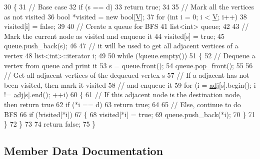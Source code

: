 \begin{DoxyCode}
30 \{
31     \textcolor{comment}{// Base case}
32     \textcolor{keywordflow}{if} (s == d)
33         \textcolor{keywordflow}{return} \textcolor{keyword}{true};
34  
35     \textcolor{comment}{// Mark all the vertices as not visited}
36     \textcolor{keywordtype}{bool} *visited = \textcolor{keyword}{new} \textcolor{keywordtype}{bool}[\hyperlink{classGraph_a2b722f7cfa7a21e4cb5fae488b3d4dcc}{V}];
37     \textcolor{keywordflow}{for} (\textcolor{keywordtype}{int} i = 0; i < \hyperlink{classGraph_a2b722f7cfa7a21e4cb5fae488b3d4dcc}{V}; i++)
38         visited[i] = \textcolor{keyword}{false};
39  
40     \textcolor{comment}{// Create a queue for BFS}
41     list<int> queue;
42  
43     \textcolor{comment}{// Mark the current node as visited and enqueue it}
44     visited[s] = \textcolor{keyword}{true};
45     queue.push\_back(s);
46  
47     \textcolor{comment}{// it will be used to get all adjacent vertices of a vertex}
48     list<int>::iterator i;
49  
50     \textcolor{keywordflow}{while} (!queue.empty())
51     \{
52         \textcolor{comment}{// Dequeue a vertex from queue and print it}
53         s = queue.front();
54         queue.pop\_front();
55  
56         \textcolor{comment}{// Get all adjacent vertices of the dequeued vertex s}
57         \textcolor{comment}{// If a adjacent has not been visited, then mark it visited}
58         \textcolor{comment}{// and enqueue it}
59         \textcolor{keywordflow}{for} (i = \hyperlink{classGraph_a04ab9c17ad31aa036def8db0f88b035b}{adj}[s].begin(); i != \hyperlink{classGraph_a04ab9c17ad31aa036def8db0f88b035b}{adj}[s].end(); ++i)
60         \{
61             \textcolor{comment}{// If this adjacent node is the destination node, then return true}
62             \textcolor{keywordflow}{if} (*i == d)
63                 \textcolor{keywordflow}{return} \textcolor{keyword}{true};
64  
65             \textcolor{comment}{// Else, continue to do BFS}
66             \textcolor{keywordflow}{if} (!visited[*i])
67             \{
68                 visited[*i] = \textcolor{keyword}{true};
69                 queue.push\_back(*i);
70             \}
71         \}
72     \}
73  
74     \textcolor{keywordflow}{return} \textcolor{keyword}{false};
75 \}
\end{DoxyCode}


\subsection{Member Data Documentation}
